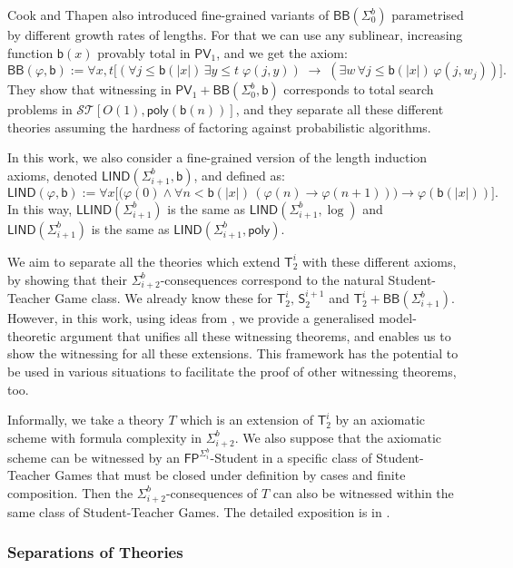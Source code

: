 \documentclass[11pt]{article}
\newcommand{\poly}{\mathsf{poly}}
\newcommand{\PV}{\mathsf{PV}}
\newcommand{\FP}{\mathsf{FP}}
\newcommand{\bd}{\mathsf{b}}
\theoremstyle{definition}
\theoremstyle{definition}
\theoremstyle{remark}
\begin{document}
Cook and Thapen also introduced fine-grained variants of $\mathsf{BB}(\Sigma^b_0)$ parametrised by different growth rates of lengths. For that we can use any sublinear, increasing function $\bd(x)$ provably total in $\PV_1$, and we get the axiom:
\[
\mathsf{BB}(\varphi,\bd):=  \forall x,t \Big[(\forall j \leq \bd(|x|) \, \exists y \leq t \; \varphi(j,y))\;\rightarrow\;(\exists w \, \forall j \leq \bd(|x| )\, \varphi(j, w_j)) \Big].
\]
They show that witnessing in $\PV_1+\mathsf{BB}(\Sigma^b_0,\bd)$ corresponds to total search problems in $\mathcal{ST}[O(1),\mathsf{poly}(\bd(n))]$, and they separate all these different theories assuming the hardness of factoring against probabilistic algorithms.

In this work, we also consider a fine-grained version of the length induction axioms, denoted $\mathsf{LIND}(\Sigma^b_{i+1}, \bd)$, and defined as:
\[
\mathsf{LIND}(\varphi,\bd):= \forall x \Big[\big(\varphi(0) \land \forall n < \bd( |x|)\, (\varphi(n)\rightarrow \varphi(n+1))\big) \rightarrow \varphi(\bd(|x|))\Big].
\]
In this way, $\mathsf{LLIND}(\Sigma^b_{i+1})$ is the same as $\mathsf{LIND}(\Sigma^b_{i+1},\log)$ and $\mathsf{LIND}(\Sigma^b_{i+1})$ is the same as $\mathsf{LIND}(\Sigma^b_{i+1},\poly)$.

We aim to separate all the theories which extend $\mathsf{T}^i_2$ with these different axioms, by showing that their $\Sigma^b_{i+2}$-consequences correspond to the natural Student-Teacher Game class. We already know these for $\mathsf{T}^i_2, \,\mathsf{S}^{i+1}_2$ and $\mathsf{T}^i_2+\mathsf{BB}(\Sigma^b_{i+1})$. However, in this work, using ideas from \cite{AVIGAD2002219,thapen2002weak,krajivcek1992no}, we provide a generalised model-theoretic argument that unifies all these witnessing theorems, and enables us to show the witnessing for all these extensions. This framework has the potential to be used in various situations to facilitate the proof of other witnessing theorems, too.

Informally, we take a theory $T$ which is an extension of $\mathsf{T}^i_2$ by an axiomatic scheme with formula complexity in $\Sigma^b_{i+2}$. We also suppose that the axiomatic scheme can be witnessed by an $\FP^{\Sigma^b_i}$-Student in a specific class of Student-Teacher Games that must be closed under definition by cases and finite composition. Then the $\Sigma^b_{i+2}$-consequences of $T$ can also be witnessed within the same class of Student-Teacher Games. The detailed exposition is in .

\subsubsection{Separations of Theories}
\end{document}
